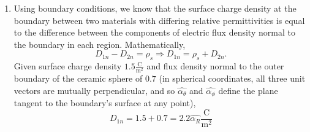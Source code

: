 \documentclass{article}
\begin{document}
\begin{enumerate}
\begin{enumerate}[label=\alph*)]
	Finding electric field at \((0,0,z)\), noting that the electric potential on the z-axis does not depend on x or y, \[
		\vec{E}_z= -(\frac{\partial V_z}{\partial x}\hat{\alpha_x} + \frac{\partial V_z}{\partial y}\hat{\alpha_y} + \frac{\partial V_z}{\partial z}\hat{\alpha_z}) = -\frac{\partial V_z}{\partial z}\hat{\alpha_z} = -\frac{\rho_\ell a}{2\varepsilon_0}\frac{d}{dz}\frac{1}{\sqrt{z^2+a^2}} = \frac{\rho_{\ell}a z}{2\varepsilon_0(z^2+a^2)^{\frac{3}{2}}}\hat{\alpha_z} \ \mathrm{\frac{V}{m}} 
	\]
		\end{enumerate}
	\item Using boundary conditions, we know that the surface charge density at the boundary between two materials with differing relative permittivities is equal to the difference between the components of electric flux density normal to the boundary in each region.  Mathematically, \[
			D_{1n} - D_{2n} = \rho_s \Rightarrow D_{1n} = \rho_s + D_{2n}.
	\]
  Given surface charge density \(1.5\mathrm{\frac{C}{m^2}}\) and flux density normal to the outer boundary of the ceramic sphere of \(0.7\) (in spherical coordinates, all three unit vectors are mutually perpendicular, and so \(\hat{\alpha_\theta}\) and \(\hat{\alpha_\phi}\) define the plane tangent to the boundary's surface at any point), 
	\[
		D_{1n} = 1.5 + 0.7 = 2.2 \hat{\alpha_R}\mathrm{\frac{C}{m^2}} 
  \] 


\end{enumerate}
\end{document}
